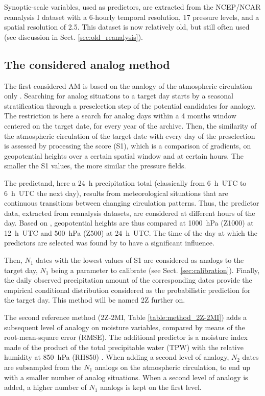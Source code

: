 \documentclass[hess, manuscript]{copernicus}
\begin{document}
Synoptic-scale variables, used as predictors, are extracted from the NCEP/NCAR reanalysis I \citep{Kalnay1996} dataset with a 6-hourly temporal resolution, 17 pressure levels, and a spatial resolution of 2.5\degree. This dataset is now relatively old, but still often used (see discussion in Sect. \ref{sec:old_reanalysis}).


\subsection{The considered analog method}
\label{sec:analog_method}

The first considered AM is based on the analogy of the atmospheric circulation only \citep[Table \ref{table:method_2Z},][]{Obled2002, Bontron2005, Marty2012}. Searching for analog situations to a target day starts by a seasonal stratification through a preselection step of the potential candidates for analogy. The restriction is here a search for analog days within a 4 months window centered on the target date, for every year of the archive. Then, the similarity of the atmospheric circulation of the target date with every day of the preselection is assessed by processing the \citet{Teweles1954} score (S1), which is a comparison of gradients, on geopotential heights over a certain spatial window and at certain hours. The smaller the S1 values, the more similar the pressure fields.

The predictand, here a 24~h precipitation total (classically from 6~h~UTC to 6~h~UTC the next day), results from meteorological situations that are continuous transitions between changing circulation patterns. Thus, the predictor data, extracted from reanalysis datasets, are considered at different hours of the day. Based on \citet{Bontron2005}, geopotential heights are thus compared at 1000~hPa (Z1000) at 12~h~UTC and 500~hPa (Z500) at 24~h~UTC. The time of the day at which the predictors are selected was found by \citet{Bontron2004} to have a significant influence.

Then, $N_{1}$ dates with the lowest values of S1 are considered as analogs to the target day, $N_{1}$ being a parameter to calibrate (see Sect. \ref{sec:calibration}). Finally, the daily observed precipitation amount of the corresponding dates provide the empirical conditional distribution considered as the probabilistic prediction for the target day. This method will be named 2Z further on.

The second reference method (2Z-2MI, Table \ref{table:method_2Z-2MI}) adds a subsequent level of analogy on moisture variables, compared by means of the root-mean-square error (RMSE). The additional predictor is a moisture index made of the product of the total precipitable water (TPW) with the relative humidity at 850~hPa (RH850) \citep{Bontron2004}. When adding a second level of analogy, $N_{2}$ dates are subsampled from the $N_{1}$ analogs on the atmospheric circulation, to end up with a smaller number of analog situations. When a second level of analogy is added, a higher number of $N_{1}$ analogs is kept on the first level.
\end{document}
